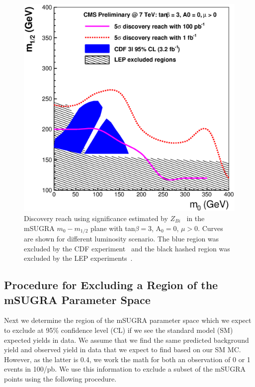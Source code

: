\vspace{3 mm}
\begin{figure}[htb]
\begin{center}
\includegraphics[width=0.7\linewidth]{figs/massreachss_bi.eps}
\caption{Discovery reach using significance estimated by $Z_{Bi}$~\cite{cite:cousins} 
in the mSUGRA $m_{0}-m_{1/2}$ plane with tan$\beta = 3$, A$_0 = 0$, $\mu > 0$. 
Curves are shown for different luminosity scenario. The blue region was excluded by 
the CDF experiment~\cite{cdf:recentSusy} and the black hashed region was excluded by the LEP 
experiments~\cite{lep:lepsusyreach}.\label{fig:ss_zbi}}
\end{center}
\end{figure}

\subsection{Procedure for Excluding a Region of the mSUGRA Parameter Space}
\label{sec:exclusion}

Next we  determine the region of  the mSUGRA parameter  space which we
expect  to exclude  at 95\%  confidence level  (CL) if  we see
the standard model (SM) expected yields in data. 
We  assume  that  we find  the  same
predicted background yield  and observed yield in data  that we expect
to  find based on  our SM  MC. However, as the latter is 0.4,
we work the math for both an observation of 0 or 1 events in 100/pb.
We  use this  information to  exclude a subset of the mSUGRA points using 
the following procedure.

